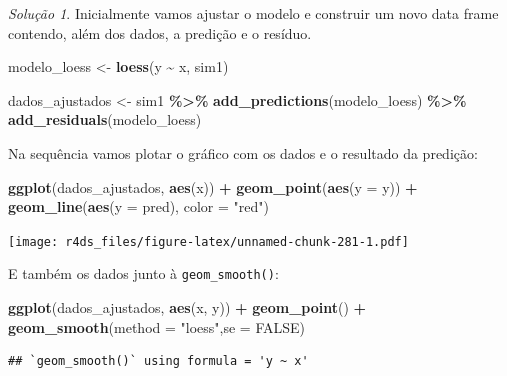 \documentclass[
]{latex/krantz}
\newenvironment{Shaded}{\begin{snugshade}}{\end{snugshade}}
\newcommand{\AttributeTok}[1]{\textcolor[rgb]{0.13,0.29,0.53}{#1}}
\newcommand{\ConstantTok}[1]{\textcolor[rgb]{0.56,0.35,0.01}{#1}}
\newcommand{\FunctionTok}[1]{\textcolor[rgb]{0.13,0.29,0.53}{\textbf{#1}}}
\newcommand{\NormalTok}[1]{#1}
\newcommand{\OtherTok}[1]{\textcolor[rgb]{0.56,0.35,0.01}{#1}}
\newcommand{\SpecialCharTok}[1]{\textcolor[rgb]{0.81,0.36,0.00}{\textbf{#1}}}
\newcommand{\StringTok}[1]{\textcolor[rgb]{0.31,0.60,0.02}{#1}}
\theoremstyle{definition}
\theoremstyle{definition}
\theoremstyle{definition}
\theoremstyle{definition}
\theoremstyle{remark}
\newtheorem*{solution}{Solução}
\begin{document}
\begin{solution}
Inicialmente vamos ajustar o modelo e construir um novo data frame contendo, além dos dados, a predição e o resíduo.

\begin{Shaded}
\begin{Highlighting}[]
\NormalTok{modelo\_loess }\OtherTok{\textless{}{-}} \FunctionTok{loess}\NormalTok{(y }\SpecialCharTok{\textasciitilde{}}\NormalTok{ x, sim1)}

\NormalTok{dados\_ajustados }\OtherTok{\textless{}{-}}\NormalTok{ sim1 }\SpecialCharTok{\%\textgreater{}\%}
                      \FunctionTok{add\_predictions}\NormalTok{(modelo\_loess) }\SpecialCharTok{\%\textgreater{}\%}
                      \FunctionTok{add\_residuals}\NormalTok{(modelo\_loess)}
\end{Highlighting}
\end{Shaded}

Na sequência vamos plotar o gráfico com os dados e o resultado da predição:

\begin{Shaded}
\begin{Highlighting}[]
\FunctionTok{ggplot}\NormalTok{(dados\_ajustados, }\FunctionTok{aes}\NormalTok{(x)) }\SpecialCharTok{+}
  \FunctionTok{geom\_point}\NormalTok{(}\FunctionTok{aes}\NormalTok{(}\AttributeTok{y =}\NormalTok{ y)) }\SpecialCharTok{+}
  \FunctionTok{geom\_line}\NormalTok{(}\FunctionTok{aes}\NormalTok{(}\AttributeTok{y =}\NormalTok{ pred), }\AttributeTok{color =} \StringTok{"red"}\NormalTok{)}
\end{Highlighting}
\end{Shaded}

\texttt{[image: r4ds\_files/figure-latex/unnamed-chunk-281-1.pdf]}

E também os dados junto à \texttt{geom\_smooth()}:

\begin{Shaded}
\begin{Highlighting}[]
\FunctionTok{ggplot}\NormalTok{(dados\_ajustados, }\FunctionTok{aes}\NormalTok{(x, y)) }\SpecialCharTok{+}
  \FunctionTok{geom\_point}\NormalTok{() }\SpecialCharTok{+}
  \FunctionTok{geom\_smooth}\NormalTok{(}\AttributeTok{method =} \StringTok{"loess"}\NormalTok{,}\AttributeTok{se =} \ConstantTok{FALSE}\NormalTok{)}
\end{Highlighting}
\end{Shaded}

\begin{verbatim}
## `geom_smooth()` using formula = 'y ~ x'
\end{verbatim}


\end{solution}
\end{document}

